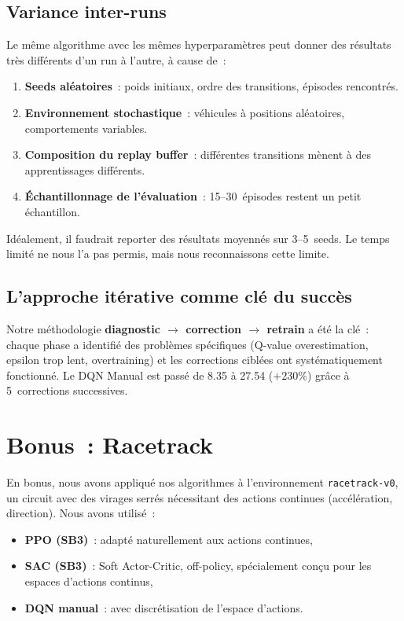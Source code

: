 \documentclass[11pt, a4paper]{article}
\begin{document}
\subsection{Variance inter-runs}

Le même algorithme avec les mêmes hyperparamètres peut donner des résultats très différents d'un run à l'autre, à cause de~:
\begin{enumerate}[nosep]
    \item \textbf{Seeds aléatoires}~: poids initiaux, ordre des transitions, épisodes rencontrés.
    \item \textbf{Environnement stochastique}~: véhicules à positions aléatoires, comportements variables.
    \item \textbf{Composition du replay buffer}~: différentes transitions mènent à des apprentissages différents.
    \item \textbf{Échantillonnage de l'évaluation}~: 15--30~épisodes restent un petit échantillon.
\end{enumerate}

Idéalement, il faudrait reporter des résultats moyennés sur 3--5~seeds. Le temps limité ne nous l'a pas permis, mais nous reconnaissons cette limite.

\subsection{L'approche itérative comme clé du succès}

Notre méthodologie \textbf{diagnostic $\to$ correction $\to$ retrain} a été la clé~: chaque phase a identifié des problèmes spécifiques (Q-value overestimation, epsilon trop lent, overtraining) et les corrections ciblées ont systématiquement fonctionné. Le DQN Manual est passé de 8.35 à 27.54 ($+230\%$) grâce à 5~corrections successives.

\section{Bonus~: Racetrack}

En bonus, nous avons appliqué nos algorithmes à l'environnement \texttt{racetrack-v0}, un circuit avec des virages serrés nécessitant des actions continues (accélération, direction). Nous avons utilisé~:
\begin{itemize}[nosep]
    \item \textbf{PPO (SB3)}~: adapté naturellement aux actions continues,
    \item \textbf{SAC (SB3)}~: Soft Actor-Critic, off-policy, spécialement conçu pour les espaces d'actions continus,
    \item \textbf{DQN manual}~: avec discrétisation de l'espace d'actions.
\end{itemize}
\end{document}
